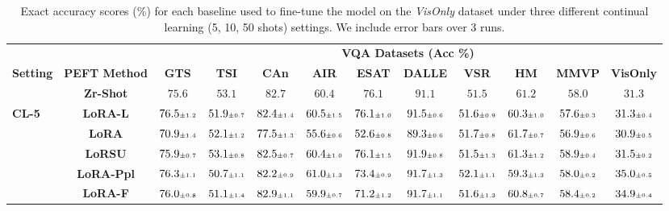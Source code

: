 \begin{table}
\caption{Exact accuracy scores (\%) for each baseline used to fine-tune the model on the \emph{VisOnly} dataset under three different continual learning (5, 10, 50 shots)  settings. We include error bars over 3 runs.}
 \label{table:fine_tune_llm_visonlyqa}
 \vskip 0.15in
\begin{center}
\begin{small}
\begingroup
\setlength{\tabcolsep}{3.6pt}
\begin{tabular}{l c c c c c c c c c c c}
\toprule
 & & \multicolumn{10}{c}{\textbf{VQA Datasets (Acc \%)}}  \\
\cmidrule(lr){3-12}
\textbf{Setting} & \textbf{PEFT Method}  & \textbf{GTS} & \textbf{TSI} & \textbf{CAn} & \textbf{AIR} & \textbf{ESAT} & \textbf{DALLE} & \textbf{VSR} & \textbf{HM} & \textbf{MMVP} & \textbf{VisOnly} \\
\midrule
 & \textbf{Zr-Shot} & $75.6$ & $53.1$ & $82.7$ & $60.4$ & $76.1$ & $91.1$ & $51.5$ & $61.2$ & $58.0$ & $31.3$ \\
\midrule
\multirow{6}{*}{\textbf{CL-5}} & \textbf{LoRA-L} & $76.5 \mbox{\tiny\ensuremath{\pm 1.2}}$ & $51.9 \mbox{\tiny\ensuremath{\pm 0.7}}$ & $82.4 \mbox{\tiny\ensuremath{\pm 1.4}}$ & $60.5 \mbox{\tiny\ensuremath{\pm 1.5}}$ & $76.1 \mbox{\tiny\ensuremath{\pm 1.0}}$ & $91.5 \mbox{\tiny\ensuremath{\pm 0.6}}$ & $51.6 \mbox{\tiny\ensuremath{\pm 0.9}}$ & $60.3 \mbox{\tiny\ensuremath{\pm 1.0}}$ & $57.6 \mbox{\tiny\ensuremath{\pm 0.3}}$ & $31.3 \mbox{\tiny\ensuremath{\pm 0.4}}$ \\
& \textbf{LoRA} & $70.9 \mbox{\tiny\ensuremath{\pm 1.4}}$ & $52.1 \mbox{\tiny\ensuremath{\pm 1.2}}$ & $77.5 \mbox{\tiny\ensuremath{\pm 1.3}}$ & $55.6 \mbox{\tiny\ensuremath{\pm 0.6}}$ & $52.6 \mbox{\tiny\ensuremath{\pm 0.8}}$ & $89.3 \mbox{\tiny\ensuremath{\pm 0.6}}$ & $51.7 \mbox{\tiny\ensuremath{\pm 0.8}}$ & $61.7 \mbox{\tiny\ensuremath{\pm 0.7}}$ & $56.9 \mbox{\tiny\ensuremath{\pm 0.6}}$ & $30.9 \mbox{\tiny\ensuremath{\pm 0.5}}$ \\
& \textbf{LoRSU} & $75.9 \mbox{\tiny\ensuremath{\pm 0.7}}$ & $53.1 \mbox{\tiny\ensuremath{\pm 0.8}}$ & $82.5 \mbox{\tiny\ensuremath{\pm 0.7}}$ & $60.4 \mbox{\tiny\ensuremath{\pm 1.0}}$ & $76.1 \mbox{\tiny\ensuremath{\pm 1.5}}$ & $91.9 \mbox{\tiny\ensuremath{\pm 0.8}}$ & $51.5 \mbox{\tiny\ensuremath{\pm 1.3}}$ & $61.3 \mbox{\tiny\ensuremath{\pm 1.2}}$ & $58.9 \mbox{\tiny\ensuremath{\pm 0.4}}$ & $31.5 \mbox{\tiny\ensuremath{\pm 0.2}}$ \\
& \textbf{LoRA-Ppl} & $76.3 \mbox{\tiny\ensuremath{\pm 1.1}}$ & $50.7 \mbox{\tiny\ensuremath{\pm 1.1}}$ & $82.2 \mbox{\tiny\ensuremath{\pm 0.9}}$ & $61.0 \mbox{\tiny\ensuremath{\pm 1.3}}$ & $73.4 \mbox{\tiny\ensuremath{\pm 0.9}}$ & $91.7 \mbox{\tiny\ensuremath{\pm 1.3}}$ & $52.1 \mbox{\tiny\ensuremath{\pm 1.1}}$ & $59.3 \mbox{\tiny\ensuremath{\pm 1.3}}$ & $58.0 \mbox{\tiny\ensuremath{\pm 0.2}}$ & $35.0 \mbox{\tiny\ensuremath{\pm 0.5}}$ \\
& \textbf{LoRA-F} & $76.0 \mbox{\tiny\ensuremath{\pm 0.8}}$ & $51.1 \mbox{\tiny\ensuremath{\pm 1.4}}$ & $82.9 \mbox{\tiny\ensuremath{\pm 1.1}}$ & $59.9 \mbox{\tiny\ensuremath{\pm 0.7}}$ & $71.2 \mbox{\tiny\ensuremath{\pm 1.2}}$ & $91.7 \mbox{\tiny\ensuremath{\pm 1.1}}$ & $51.6 \mbox{\tiny\ensuremath{\pm 1.3}}$ & $60.8 \mbox{\tiny\ensuremath{\pm 0.7}}$ & $58.4 \mbox{\tiny\ensuremath{\pm 0.2}}$ & $34.9 \mbox{\tiny\ensuremath{\pm 0.4}}$ \\

\end{tabular}
\end{small}
\end{center}
\end{table}
